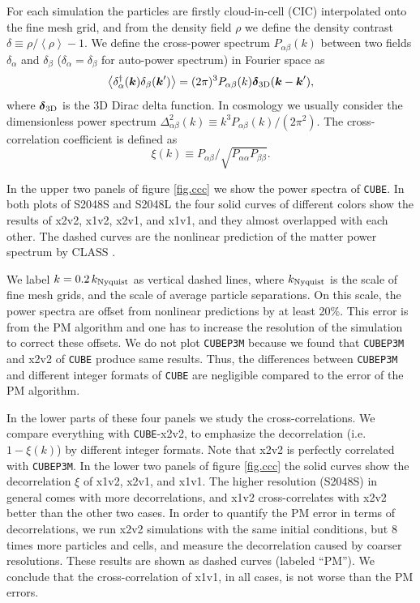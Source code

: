 \documentclass[10pt,twocolumn,preprint]{emulateapj}
\newcommand{\bs}{\boldsymbol}
\begin{document}
For each simulation the particles are firstly cloud-in-cell (CIC) interpolated onto the fine mesh grid, and from the density field $\rho$ we define the density contrast $\delta\equiv \rho/\left\langle \rho \right\rangle-1$. We define the cross-power spectrum $P_{\alpha\beta}(k)$ between two fields $\delta_\alpha$ and $\delta_\beta$ ($\delta_\alpha=\delta_\beta$ for auto-power spectrum) in Fourier space as
\begin{equation}\label{eq.cps}
	\left\langle \delta_\alpha^\dagger({\bs k})\delta_\beta({\bs k}') \right\rangle=
    (2\pi)^3 P_{\alpha\beta}(k){\bs \delta}_{\rm 3D}({\bs k}-{\bs k}'),
\end{equation}
where ${\bs \delta}_{\rm 3D}$ is the 3D Dirac delta function. In cosmology we usually consider the dimensionless power spectrum $\Delta^2_{\alpha\beta}(k)\equiv k^3 P_{\alpha\beta}(k)/(2\pi^2)$. The cross-correlation coefficient is defined as
\begin{equation}\label{eq.ccc}
	\xi(k)\equiv P_{\alpha\beta}/\sqrt{P_{\alpha\alpha}P_{\beta\beta}}.
\end{equation}

In the upper two panels of figure \ref{fig.ccc} we show the power spectra of {\tt CUBE}. In both plots of S2048S and S2048L the four solid curves of different colors show the results of x2v2, x1v2, x2v1, and x1v1, and they almost overlapped with each other. The dashed curves are the nonlinear prediction of the matter power spectrum by CLASS \citep{2011JCAP...07..034B}.

We label $k=0.2\,k_{\rm Nyquist}$ as vertical dashed lines, where $k_{\rm Nyquist}$ is the scale of fine mesh grids, and the scale of average particle separations. On this scale, the power spectra are offset from nonlinear predictions by at least 20\%. This error is from the PM algorithm and one has to increase the resolution of the simulation to correct these offsets. We do not plot {\tt CUBEP3M} because we found that {\tt CUBEP3M} and x2v2 of {\tt CUBE} produce same results. Thus, the differences between {\tt CUBEP3M} and different integer formats of {\tt CUBE} are negligible compared to the error of the PM algorithm.

In the lower parts of these four panels we study the cross-correlations. We compare everything with {\tt CUBE}-x2v2, to emphasize the decorrelation (i.e. $1-\xi(k)$) by different integer formats. Note that x2v2 is perfectly correlated with {\tt CUBEP3M}. In the lower two panels of figure \ref{fig.ccc} the solid curves show the decorrelation $\xi$ of x1v2, x2v1, and x1v1. The higher resolution (S2048S) in general comes with more decorrelations, and x1v2 cross-correlates with x2v2 better than the other two cases. In order to quantify the PM error in terms of decorrelations, we run x2v2 simulations with the same initial conditions, but 8 times more particles and cells, and measure the decorrelation caused by coarser resolutions. These results are shown as dashed curves (labeled ``PM''). We conclude that the cross-correlation of x1v1, in all cases, is not worse than the PM errors.
\end{document}
